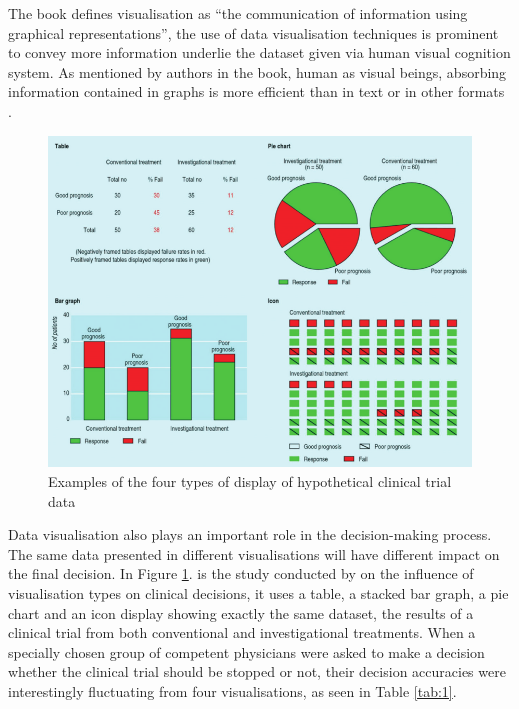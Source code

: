 \documentclass[doc,natbib]{apa6}
\begin{document}
The book defines visualisation as ``the communication of information using graphical representations'', the use of data visualisation techniques is prominent to convey more information underlie the dataset given via human visual cognition system. As mentioned by authors in the book, human as visual beings, absorbing information contained in graphs is more efficient than in text or in other formats \citep[pp. 3-5]{Ward2010}.

\begin{figure}[H]
	\centering
	\includegraphics{figures/fig1.png}
	\caption{\label{fig:1}Examples of the four types of display of hypothetical clinical trial data \citep{Elting1999}}
\end{figure}

Data visualisation also plays an important role in the decision-making process. The same data presented in different visualisations will have different impact on the final decision. In Figure \ref{fig:1}. is the study conducted by \citeauthor{Elting1999} \citep{Elting1999} on the influence of visualisation types on clinical decisions, it uses a table, a stacked bar graph, a pie chart and an icon display showing exactly the same dataset, the results of a clinical trial from both conventional and investigational treatments. When a specially chosen group of competent physicians were asked to make a decision whether the clinical trial should be stopped or not, their decision accuracies were interestingly fluctuating from four visualisations, as seen in Table \ref{tab:1}.
\end{document}
